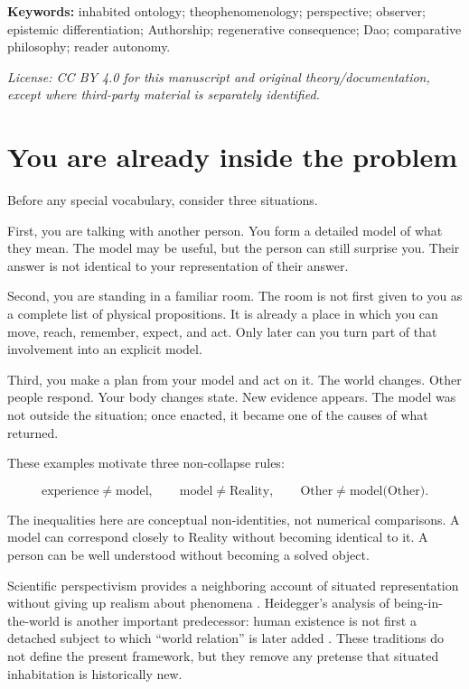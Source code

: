 \documentclass[11pt]{article}
\begin{document}
\noindent\textbf{Keywords:} inhabited ontology; theophenomenology; perspective; observer; epistemic differentiation; Authorship; regenerative consequence; Dao; comparative philosophy; reader autonomy.

\medskip
\noindent\small\textit{License: CC BY 4.0 for this manuscript and original theory/documentation, except where third-party material is separately identified.}\normalsize

\tableofcontents
\newpage

\section{You are already inside the problem}

Before any special vocabulary, consider three situations.

First, you are talking with another person. You form a detailed model of what they mean. The model may be useful, but the person can still surprise you. Their answer is not identical to your representation of their answer.

Second, you are standing in a familiar room. The room is not first given to you as a complete list of physical propositions. It is already a place in which you can move, reach, remember, expect, and act. Only later can you turn part of that involvement into an explicit model.

Third, you make a plan from your model and act on it. The world changes. Other people respond. Your body changes state. New evidence appears. The model was not outside the situation; once enacted, it became one of the causes of what returned.

These examples motivate three non-collapse rules:

\begin{equation}
\text{experience}\neq\text{model},\qquad
\text{model}\neq\text{Reality},\qquad
\text{Other}\neq\text{model(Other)}.
\end{equation}

The inequalities here are conceptual non-identities, not numerical comparisons. A model can correspond closely to Reality without becoming identical to it. A person can be well understood without becoming a solved object.

Scientific perspectivism provides a neighboring account of situated representation without giving up realism about phenomena \cite{Massimi2022Perspectival}. Heidegger's analysis of being-in-the-world is another important predecessor: human existence is not first a detached subject to which ``world relation'' is later added \cite{Heidegger2026BeingTime,SEPHeidegger2025}. These traditions do not define the present framework, but they remove any pretense that situated inhabitation is historically new.
\end{document}
